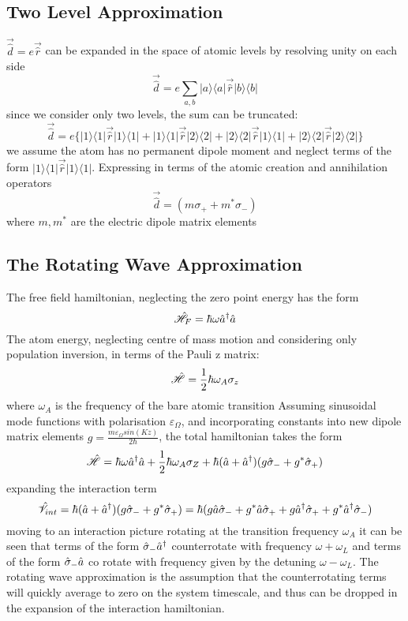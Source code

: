 \subsection{Two Level Approximation}
$\vec{\hat{d}} = e \vec{\hat{r}}$ can be expanded in the space of atomic levels by resolving unity on each side
\begin{equation}
	\vec{\hat{d}} = e \sum_{a, b} | a \rangle \langle a | \vec{\hat{r} }| b \rangle \langle b |
\end{equation}
since we consider only two levels, the sum can be truncated:
\begin{equation}
	\vec{\hat{d}} = e\{| 1 \rangle \langle 1|\vec{\hat{r}} | 1 \rangle \langle 1 | + | 1 \rangle \langle 1|\vec{\hat{r}} | 2 \rangle \langle 2 | + | 2 \rangle \langle 2|\vec{\hat{r}} | 1 \rangle \langle 1 | + | 2 \rangle \langle 2|\vec{\hat{r}} | 2 \rangle \langle 2 | \}
\end{equation}
we assume the atom has no permanent dipole moment and neglect terms of the form $| 1 \rangle \langle 1|\vec{\hat{r}} | 1 \rangle \langle 1 |$.
Expressing in terms of the atomic creation and annihilation operators
\begin{equation}
	\vec{\hat{d}} = (m\sigma_+ + m^* \sigma_-)
\end{equation}
where $m, m^*$ are the electric dipole matrix elements
\subsection{The Rotating Wave Approximation}
The free field hamiltonian, neglecting the zero point energy has the form
\begin{equation}
	\hat{\mathscr{H}}_F =  \hbar \omega \hat{a}^\dagger \hat{a}
\end{equation}
The atom energy, neglecting centre of mass motion and considering only population inversion, in terms of the Pauli z matrix:
\begin{equation}
	\hat{\mathscr{H}} = \frac {1} {2} \hbar \omega_A \sigma_z
\end{equation}
where $\omega_A$ is the frequency of the bare atomic transition
Assuming sinusoidal mode functions with polarisation $\varepsilon_\Omega$, and incorporating constants into new dipole matrix elements $g = \frac{m \varepsilon_\Omega sin(Kz)} {2 \hbar}$, the total hamiltonian takes the form
\begin{equation}
	\hat{\mathscr{H}} = \hbar \omega \hat{a}^\dagger \hat{a} +\frac{1}{2} \hbar \omega_A \sigma_Z + \hbar (\hat{a} +\hat{a}^\dagger)(g\hat{\sigma}_-+g^*\hat{\sigma}_+)
\end{equation}
expanding the interaction term
\begin{equation}
	\hat{\mathscr{V}}_{int} = \hbar (\hat{a} +\hat{a}^\dagger)(g\hat{\sigma}_-+g^*\hat{\sigma}_+) =  \hbar (g \hat{a} \hat{\sigma}_- + g^* \hat{a} \hat{\sigma}_+ + g \hat{a}^\dagger \hat{\sigma}_+ +g^* \hat{a}^\dagger\hat{\sigma}_-)
\end{equation}
moving to an interaction picture rotating at the transition frequency $\omega_A$ it can be seen that terms of the form $\hat{\sigma}_- \hat{a}^\dagger $ counterrotate with frequency $\omega + \omega_L$ and terms of the form $ \hat{\sigma}_- \hat{a}$ co rotate with frequency given by the detuning $\omega-\omega_L$.
The rotating wave approximation is the assumption that the counterrotating terms will quickly average to zero on the system timescale, and thus can be dropped in the expansion of the interaction hamiltonian.
